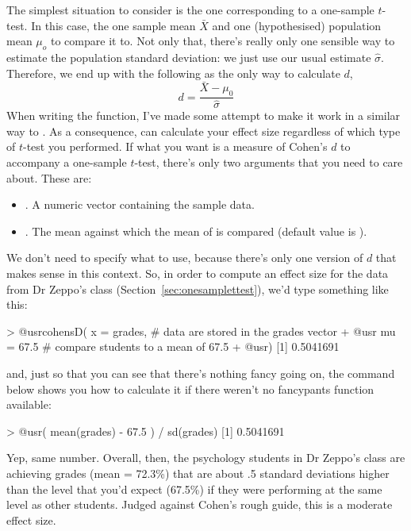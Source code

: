 The simplest situation to consider is the one corresponding to a one-sample $t$-test. In this case, the one sample mean $\bar{X}$ and one (hypothesised) population mean $\mu_o$ to compare it to. Not only that, there's really only one sensible way to estimate the population standard deviation: we just use our usual estimate $\hat{\sigma}$. Therefore, we end up with the following as the only way to calculate $d$, 
$$
d = \frac{\bar{X} - \mu_0}{\hat{\sigma}}
$$
When writing the  function, I've made some attempt to make it work in a similar way to . As a consequence,  can calculate your effect size regardless of which type of $t$-test you performed. If what you want is a measure of Cohen's $d$ to accompany a one-sample $t$-test, there's only two arguments that you need to care about. These are:
\begin{itemize}
\item {}. A numeric vector containing the sample data.
\item {}. The mean against which the mean of  is compared (default value is ).
\end{itemize}
We don't need to specify what  to use, because there's only one version of $d$ that makes sense in this context. So, in order to compute an effect size for the data from Dr Zeppo's class (Section~\ref{sec:onesamplettest}), we'd type something like this:
\begin{rblock1}
> @usr{cohensD( x = grades, }   # data are stored in the grades vector
+ @usr{         mu = 67.5}      # compare students to a mean of 67.5
+ @usr{)}
[1] 0.5041691
\end{rblock1}
and, just so that you can see that there's nothing fancy going on, the command below shows you how to calculate it if there weren't no fancypants  function available:
\begin{rblock1}
> @usr{( mean(grades) - 67.5 ) / sd(grades)}
[1] 0.5041691
\end{rblock1}
Yep, same number. Overall, then, the psychology students in Dr Zeppo's class are achieving grades (mean = 72.3\%) that are about .5 standard deviations higher than the level that you'd expect (67.5\%) if they were performing at the same level as other students. Judged against Cohen's rough guide, this is a moderate effect size.



